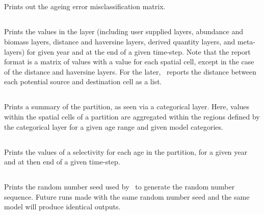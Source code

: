 \subsection{}\label{sec:ageingerrorreport}

Prints out the ageing error misclassification matrix.

\subsection{}

Prints the values in the layer (including user supplied layers, abundance and biomass layers, distance and haversine layers, derived quantity layers, and meta-layers) for given year and at the end of a given time-step. Note that the report format is a matrix of values with a value for each spatial cell, except in the case of the distance and haversine layers. For the later, \SPM\ reports the distance between each potential source and destination cell as a list.

\subsection{}

Prints a summary of the partition, as seen via a categorical layer. Here, values within the spatial cells of a partition are aggregated within the regions defined by the categorical layer for a given age range and given model categories.

\subsection{}

Prints the values of a selectivity for each age in the partition, for a given year and at then end of a given time-step.

\subsection{}

Prints the random number seed used by \SPM\ to generate the random number sequence. Future runs made with the same random number seed and the same model will produce identical outputs.


